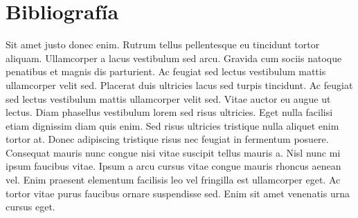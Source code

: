 \chapter{Bibliografía}
Sit amet justo donec enim. Rutrum tellus pellentesque eu tincidunt tortor aliquam. Ullamcorper a lacus vestibulum sed arcu. Gravida cum sociis natoque penatibus et magnis dis parturient. Ac feugiat sed lectus vestibulum mattis ullamcorper velit sed. Placerat duis ultricies lacus sed turpis tincidunt. Ac feugiat sed lectus vestibulum mattis ullamcorper velit sed. Vitae auctor eu augue ut lectus. Diam phasellus vestibulum lorem sed risus ultricies. Eget nulla facilisi etiam dignissim diam quis enim. Sed risus ultricies tristique nulla aliquet enim tortor at. Donec adipiscing tristique risus nec feugiat in fermentum posuere. Consequat mauris nunc congue nisi vitae suscipit tellus mauris a. Nisl nunc mi ipsum faucibus vitae. Ipsum a arcu cursus vitae congue mauris rhoncus aenean vel. Enim praesent elementum facilisis leo vel fringilla est ullamcorper eget. Ac tortor vitae purus faucibus ornare suspendisse sed. Enim sit amet venenatis urna cursus eget.
